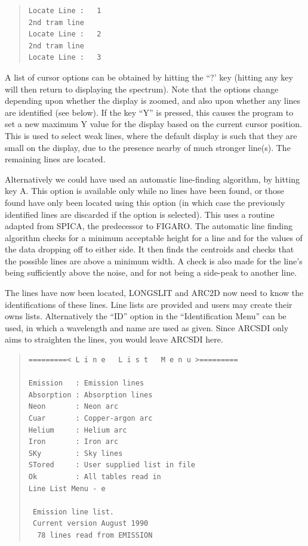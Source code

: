 \documentclass[11pt,twoside]{article}
\newcommand{\xref}[3]{#1}
\begin{document}
\begin{quote}\begin{verbatim}
Locate Line :   1
2nd tram line
Locate Line :   2
2nd tram line
Locate Line :   3
\end{verbatim}\end{quote}

A list of cursor options can be obtained by hitting the ``?' key (hitting
any key will then return to displaying the spectrum).
Note that the options change depending upon whether the display is
zoomed, and also upon whether any lines are identified (see below).
If the key ``Y'' is pressed, this causes the program to set a new
maximum Y value for the display based on the current cursor position.
This is used to select weak lines, where the default display is such
that they are small on the display, due to the presence nearby of much
stronger line(s).
The remaining lines are located.

Alternatively we could have used an automatic line-finding algorithm,
by hitting key A. This option is available only while no lines have
been found, or those found have only been located using this option (in
which case the previously identified lines are discarded if the option
is selected).  This uses a routine adapted from SPICA, the predecessor
to \xref{FIGARO}{sun86}{}.  The automatic line finding algorithm checks
for a minimum acceptable height for a line and for the values of the
data dropping off to either side. It then finds the centroids and
checks that the possible lines are above a minimum width. A check is
also made for the line's being sufficiently above the noise, and for
not being a side-peak to another line.

The lines have now been located, LONGSLIT and ARC2D now need to know the
identifications of these lines.
Line lists are provided and users may create their owns lists.
Alternatively the ``ID'' option in the ``Identification Menu'' can be
used, in which a wavelength and name are used as given.
Since ARCSDI only aims to straighten the lines, you would leave ARCSDI
here.

\begin{quote}\begin{verbatim}
=========< L i n e   L i s t   M e n u >=========

Emission   : Emission lines
Absorption : Absorption lines
Neon       : Neon arc
Cuar       : Copper-argon arc
Helium     : Helium arc
Iron       : Iron arc
SKy        : Sky lines
STored     : User supplied list in file
Ok         : All tables read in
Line List Menu - e

 Emission line list.
 Current version August 1990
  78 lines read from EMISSION
\end{verbatim}\end{quote}
\end{document}

